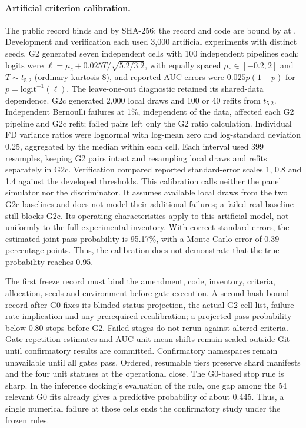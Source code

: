 \paragraph{Artificial criterion calibration.}\label{supp:gate-calibration}
The public record  binds  and  by SHA-256; the record and code are bound by  at . Development and verification each used 3,000 artificial experiments with distinct seeds. G2 generated seven independent cells with 100 independent pipelines each: logits were $\ell=\mu_c+0.025T/\sqrt{5.2/3.2}$, with equally spaced $\mu_c\in[-0.2,2]$ and $T\sim t_{5.2}$ (ordinary kurtosis 8), and reported AUC errors were $0.025p(1-p)$ for $p=\mathrm{logit}^{-1}(\ell)$. The leave-one-out diagnostic retained its shared-data dependence. G2c generated 2,000 local draws and 100 or 40 refits from $t_{5.2}$. Independent Bernoulli failures at 1\%, independent of the data, affected each G2 pipeline and G2c refit; failed pairs left only the G2 ratio calculation. Individual FD variance ratios were lognormal with log-mean zero and log-standard deviation 0.25, aggregated by the median within each cell. Each interval used 399 resamples, keeping G2 pairs intact and resampling local draws and refits separately in G2c. Verification compared reported standard-error scales 1, 0.8 and 1.4 against the developed thresholds. This calibration calls neither the panel simulator nor the discriminator. It assumes available local draws from the two G2c baselines and does not model their additional failures; a failed real baseline still blocks G2c. Its operating characteristics apply to this artificial model, not uniformly to the full experimental inventory.
With correct standard errors, the estimated joint pass probability is 95.17\%, with a Monte Carlo error of 0.39 percentage points. Thus, the calibration does not demonstrate that the true probability reaches 0.95. %


The first freeze record must bind the amendment, code, inventory, criteria, allocation, seeds and environment before gate execution. A second hash-bound record after G0 fixes its blinded status projection, the actual G2 cell list, failure-rate implication and any prerequired recalibration; a projected pass probability below 0.80 stops before G2. Failed stages do not rerun against altered criteria. Gate repetition estimates and AUC-unit mean shifts remain sealed outside Git until confirmatory results are committed. Confirmatory namespaces remain unavailable until all gates pass. Ordered, resumable tiers preserve shard manifests and the four unit statuses at the operational close.
The G0-based stop rule is sharp. In the inference docking's evaluation of the rule, one gap among the 54 relevant G0 fits already gives a predictive probability of about 0.445. Thus, a single numerical failure at those cells ends the confirmatory study under the frozen rules. %


